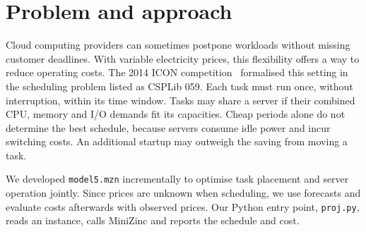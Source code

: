 \documentclass[10pt,a4paper,twocolumn]{article}
\newcommand{\code}[1]{\texttt{#1}}
\begin{document}

\section{Problem and approach}
Cloud computing providers can sometimes postpone workloads without missing customer deadlines. With variable electricity prices, this flexibility offers a way to reduce operating costs. The 2014 ICON competition~\cite{icon} formalised this setting in the scheduling problem listed as CSPLib 059. Each task must run once, without interruption, within its time window. Tasks may share a server if their combined CPU, memory and I/O demands fit its capacities. Cheap periods alone do not determine the best schedule, because servers consume idle power and incur switching costs. An additional startup may outweigh the saving from moving a task.

We developed \code{model5.mzn} incrementally to optimise task placement and server operation jointly. Since prices are unknown when scheduling, we use forecasts and evaluate costs afterwards with observed prices. Our Python entry point, \code{proj.py}, reads an instance, calls MiniZinc and reports the schedule and cost.
\end{document}
